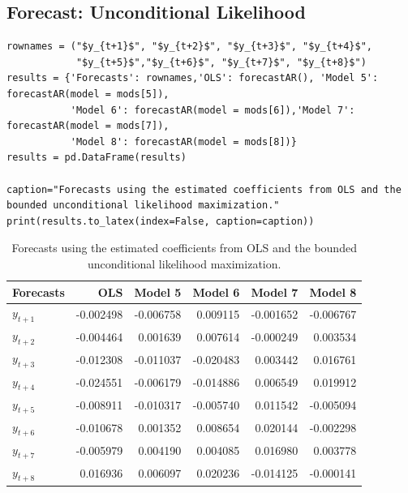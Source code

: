 \documentclass{article}
\begin{document}
\subsection{Forecast: Unconditional Likelihood}
\begin{verbatim}
rownames = ("$y_{t+1}$", "$y_{t+2}$", "$y_{t+3}$", "$y_{t+4}$",
            "$y_{t+5}$","$y_{t+6}$", "$y_{t+7}$", "$y_{t+8}$")
results = {'Forecasts': rownames,'OLS': forecastAR(), 'Model 5': forecastAR(model = mods[5]),
           'Model 6': forecastAR(model = mods[6]),'Model 7': forecastAR(model = mods[7]),
           'Model 8': forecastAR(model = mods[8])}
results = pd.DataFrame(results)

caption="Forecasts using the estimated coefficients from OLS and the bounded unconditional likelihood maximization."
print(results.to_latex(index=False, caption=caption))
\end{verbatim}
\begin{table}[h]
\centering
\caption{Forecasts using the estimated coefficients from OLS and the bounded unconditional likelihood maximization.}
\begin{tabular}{lrrrrr}
\toprule
Forecasts & OLS & Model 5 & Model 6 & Model 7 & Model 8 \\
\midrule
$y_{t+1}$ & -0.002498 & -0.006758 & 0.009115 & -0.001652 & -0.006767 \\
$y_{t+2}$ & -0.004464 & 0.001639 & 0.007614 & -0.000249 & 0.003534 \\
$y_{t+3}$ & -0.012308 & -0.011037 & -0.020483 & 0.003442 & 0.016761 \\
$y_{t+4}$ & -0.024551 & -0.006179 & -0.014886 & 0.006549 & 0.019912 \\
$y_{t+5}$ & -0.008911 & -0.010317 & -0.005740 & 0.011542 & -0.005094 \\
$y_{t+6}$ & -0.010678 & 0.001352 & 0.008654 & 0.020144 & -0.002298 \\
$y_{t+7}$ & -0.005979 & 0.004190 & 0.004085 & 0.016980 & 0.003778 \\
$y_{t+8}$ & 0.016936 & 0.006097 & 0.020236 & -0.014125 & -0.000141 \\
\bottomrule
\end{tabular}
\end{table}
\end{document}
